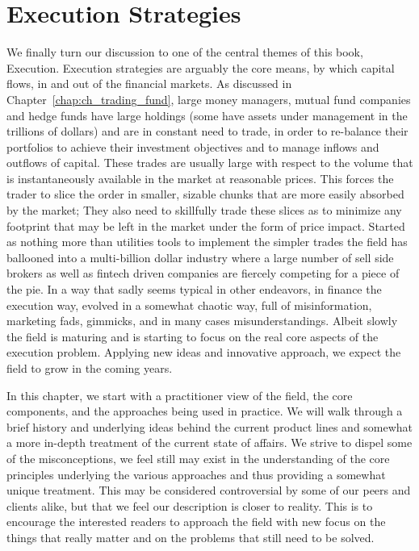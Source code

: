 \chapter{Execution Strategies\label{chap:ch_exec_models}}

We finally turn our discussion to one of the central themes of this book, Execution. Execution strategies are arguably the core means, by which capital flows, in and out of the financial markets.  As discussed in Chapter~\ref{chap:ch_trading_fund}, large money managers, mutual fund companies and hedge funds have large holdings (some have assets under management in the trillions of dollars) and are in constant need to trade, in order to re-balance their portfolios to achieve their investment objectives and to manage inflows and outflows of capital. These trades are usually large with respect to the volume that is instantaneously available in the market at reasonable prices. This forces the trader to slice the order in smaller, sizable chunks that are more easily absorbed by the market; They also need to skillfully trade these slices as to minimize any footprint that may be left in the market under the form of price impact. Started as nothing more than utilities tools to implement the simpler trades the field has ballooned into a multi-billion dollar industry where a large number of sell side brokers as well as fintech driven companies are fiercely competing for a piece of the pie. In a way that sadly seems typical in other endeavors, in finance the execution way, evolved in a somewhat chaotic way, full of misinformation, marketing fads, gimmicks, and in many cases misunderstandings. Albeit slowly the field is maturing and is starting to focus on the real core aspects of the execution problem. Applying new ideas and innovative approach, we expect the field to grow in the coming years.


In this chapter, we start with a practitioner view of the field, the core components, and the approaches being used in practice. We will walk through a brief history and underlying ideas behind the current product lines and somewhat a more in-depth treatment of the current state of affairs. We strive to dispel some of the misconceptions, we feel still may exist in the understanding of the core principles underlying the various approaches and thus providing a somewhat unique treatment. This may be considered controversial by some of our peers and clients alike, but that we feel our description is closer to reality. This is to encourage the interested readers to approach the field with new focus on the things that really matter and on the problems that still need to be solved.


